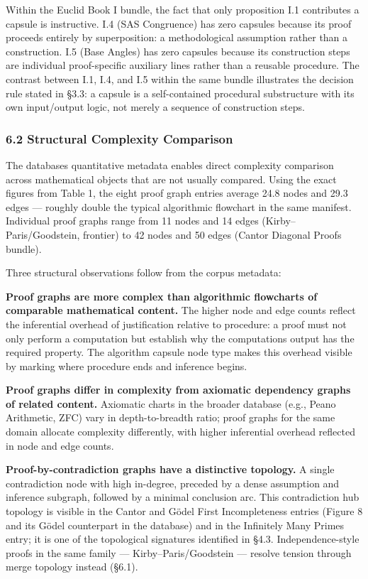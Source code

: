 \documentclass[
  11pt]{article}
\begin{document}
Within the Euclid Book I bundle, the fact that only proposition I.1
contributes a capsule is instructive. I.4 (SAS Congruence) has zero
capsules because its proof proceeds entirely by superposition: a
methodological assumption rather than a construction. I.5 (Base Angles)
has zero capsules because its construction steps are individual
proof-specific auxiliary lines rather than a reusable procedure. The
contrast between I.1, I.4, and I.5 within the same bundle illustrates
the decision rule stated in §3.3: a capsule is a self-contained
procedural substructure with its own input/output logic, not merely a
sequence of construction steps.

\hypertarget{62-structural-complexity-comparison}{%
\subsubsection{6.2 Structural Complexity
Comparison}\label{62-structural-complexity-comparison}}

The database\textquotesingle s quantitative metadata enables direct
complexity comparison across mathematical objects that are not usually
compared. Using the exact figures from Table 1, the eight proof graph
entries average 24.8 nodes and 29.3 edges --- roughly double the typical
algorithmic flowchart in the same manifest. Individual proof graphs
range from 11 nodes and 14 edges (Kirby--Paris/Goodstein, frontier) to
42 nodes and 50 edges (Cantor Diagonal Proofs bundle).

Three structural observations follow from the corpus metadata:

\textbf{Proof graphs are more complex than algorithmic flowcharts of
comparable mathematical content.} The higher node and edge counts
reflect the inferential overhead of justification relative to procedure:
a proof must not only perform a computation but establish why the
computation\textquotesingle s output has the required property. The
algorithm capsule node type makes this overhead visible by marking where
procedure ends and inference begins.

\textbf{Proof graphs differ in complexity from axiomatic dependency
graphs of related content.} Axiomatic charts in the broader database
(e.g., Peano Arithmetic, ZFC) vary in depth-to-breadth ratio; proof
graphs for the same domain allocate complexity differently, with higher
inferential overhead reflected in node and edge counts.

\textbf{Proof-by-contradiction graphs have a distinctive topology.} A
single contradiction node with high in-degree, preceded by a dense
assumption and inference subgraph, followed by a minimal conclusion arc.
This contradiction hub topology is visible in the Cantor and Gödel First
Incompleteness entries (Figure 8 and its Gödel counterpart in the
database) and in the Infinitely Many Primes entry; it is one of the
topological signatures identified in §4.3. Independence-style proofs in
the same family --- Kirby--Paris/Goodstein --- resolve tension through
merge topology instead (§6.1).
\end{document}

